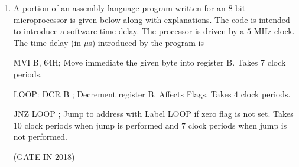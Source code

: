 
\begin{enumerate}

\item
\label{prob:gate IN 45}
 A portion of an assembly language program written for an $8$-bit microprocessor is given below along with explanations. The code is intended to introduce a software time delay. The processor is driven by a $5$ MHz clock. The time delay (in $\mu$s) introduced by the program is \vspace{12 pt}


MVI B, $64$H; Move immediate the given byte into register B. Takes $7$ clock periods.\vspace{12 pt}


LOOP: DCR B ; Decrement register B. Affects Flags. Takes $4$ clock periods. \vspace{12 pt}


JNZ LOOP ; Jump to address with Label LOOP if zero flag is not set. Takes $10$ clock periods when jump is performed and $7$ clock periods when jump is not performed.

\hfill(GATE IN 2018)

\end{enumerate}
